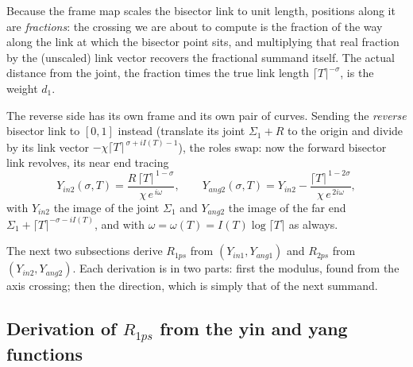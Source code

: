 \documentclass[11pt]{article}
\theoremstyle{definition}
\begin{document}
Because the frame map scales the bisector link to unit length, positions along
it are \emph{fractions}: the crossing we are about to compute is the fraction
of the way along the link at which the bisector point sits, and multiplying
that real fraction by the (unscaled) link vector recovers the fractional
summand itself. The actual distance from the joint, the fraction times the
true link length $\lceil T\rceil^{-\sigma}$, is the weight $d_1$.

The reverse side has its own frame and its own pair of curves. Sending the
\emph{reverse} bisector link to $[0,1]$ instead (translate its joint
$\Sigma_1+R$ to the origin and divide by its link vector
$-\chi\lceil T\rceil^{\,\sigma+iI(T)-1}$), the roles swap: now the forward
bisector link revolves, its near end tracing
\begin{equation}\label{eq:yin2yang2}
Y_{in2}(\sigma,T)=\frac{R\,\lceil T\rceil^{\,1-\sigma}}{\chi\,e^{\,i\omega}},
\qquad
Y_{ang2}(\sigma,T)=Y_{in2}-\frac{\lceil T\rceil^{\,1-2\sigma}}{\chi\,e^{\,2i\omega}},
\end{equation}
with $Y_{in2}$ the image of the joint $\Sigma_1$ and $Y_{ang2}$ the image of
the far end $\Sigma_1+\lceil T\rceil^{-\sigma-iI(T)}$, and with
$\omega=\omega(T)=I(T)\log\lceil T\rceil$ as always.

The next two subsections derive $R_{1ps}$ from $(Y_{in1},Y_{ang1})$ and
$R_{2ps}$ from $(Y_{in2},Y_{ang2})$. Each derivation is in two parts: first
the modulus, found from the axis crossing; then the direction, which is simply
that of the next summand.

\subsection{Derivation of \texorpdfstring{$R_{1ps}$}{R1ps} from the yin and yang functions}\label{sec:derive-r1ps}
\end{document}
